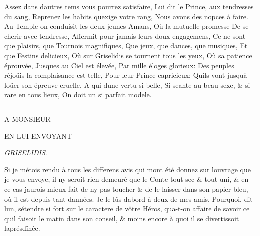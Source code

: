 \documentclass[14pt,a4paper]{memoir}
\begin{document}
{{\begin{otherlanguage}{french}
{Assez dans d\textquotesingle autres tems vous pourrez satisfaire, }
{Lui dit le Prince, aux tendresses du sang,} {Reprenez les habits
qu\textquotesingle exige votre rang,} {Nous avons des nopces à faire.}
{Au Temple on conduisit les deux jeunes Amans,} {Où la mutuelle
promesse} {De se cherir avec tendresse,} {Affermit pour jamais leurs
doux engagemens,} {Ce ne sont que plaisirs, que Tournois magnifiques,}
{Que jeux, que dances, que musiques,} {Et que Festins delicieux,} {Où
sur Griselidis se tournent tous les yeux,} {Où sa patience éprouvée,}
{Jusques au Ciel est élevée,} {Par mille éloges glorieux:} {Des peuples
réjoüis la complaisance est telle,} {Pour leur Prince capricieux;}
{Qu\textquotesingle ils vont jusqu\textquotesingle à loüer son épreuve
cruelle,} {A qui d\textquotesingle une vertu si belle,} {Si seante au
beau sexe, \& si rare en tous lieux,} {On doit un si parfait modele.}

\begin{center}\rule{0.5\linewidth}{0.5pt}\end{center}

A MONSIEUR ------

EN LUI ENVOYANT

\emph{GRISELIDIS}.

Si je m\textquotesingle étois rendu à tous les differens avis qui
m\textquotesingle ont été donnez sur l\textquotesingle ouvrage que je
vous envoye, il n\textquotesingle y seroit rien demeuré que le Conte
tout sec \& tout uni, \& en ce cas j\textquotesingle aurois mieux fait
de n\textquotesingle y pas toucher \& de le laisser dans son papier
bleu, où il est depuis tant d\textquotesingle années. Je le lûs
d\textquotesingle abord à deux de mes amis. Pourquoi, dit
l\textquotesingle un, s\textquotesingle étendre si fort sur le caractere
de vôtre Héros, qu\textquotesingle a-t-on affaire de savoir ce
qu\textquotesingle il faisoit le matin dans son conseil, \& moins encore
à quoi il se divertissoit l\textquotesingle aprésdînée.


\end{otherlanguage}}}
\end{document}
